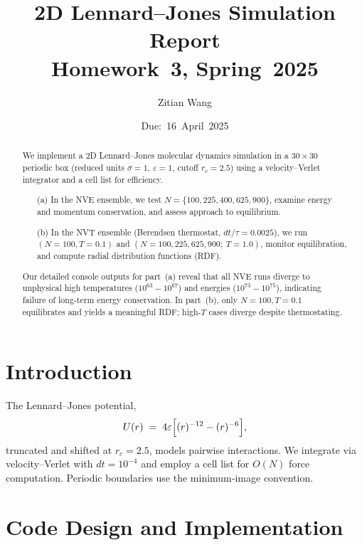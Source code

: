 \documentclass[11pt]{article}
\title{2D Lennard–Jones Simulation Report\\
Homework 3, Spring 2025}
\author{Zitian Wang}
\date{Due: 16 April 2025}
\begin{document}
\maketitle

\begin{abstract}
We implement a 2D Lennard–Jones molecular dynamics simulation in a $30\times30$ periodic box (reduced units $\sigma=1$, $\varepsilon=1$, cutoff $r_c=2.5$) using a velocity–Verlet integrator and a cell list for efficiency.  
\begin{enumerate}
  \item[(a)] In the NVE ensemble, we test $N=\{100,225,400,625,900\}$, examine energy and momentum conservation, and assess approach to equilibrium.
  \item[(b)] In the NVT ensemble (Berendsen thermostat, $dt/\tau=0.0025$), we run $(N=100,T=0.1)$ and $(N=100,225,625,900;\:T=1.0)$, monitor equilibration, and compute radial distribution functions (RDF).
\end{enumerate}
Our detailed console outputs for part (a) reveal that all NVE runs diverge to unphysical high temperatures ($10^{63}\!-\!10^{67}$) and energies ($10^{73}\!-\!10^{75}$), indicating failure of long‐term energy conservation.  In part (b), only $N=100,T=0.1$ equilibrates and yields a meaningful RDF; high‐$T$ cases diverge despite thermostating.
\end{abstract}

\section{Introduction}
The Lennard–Jones potential,
\[
  U(r) \;=\; 4\varepsilon\Bigl[(r)^{-12} - (r)^{-6}\Bigr],
\]
truncated and shifted at $r_c=2.5$, models pairwise interactions.  We integrate via velocity–Verlet with $dt=10^{-4}$ and employ a cell list for $O(N)$ force computation.  Periodic boundaries use the minimum‐image convention.

\section{Code Design and Implementation}
\end{document}

